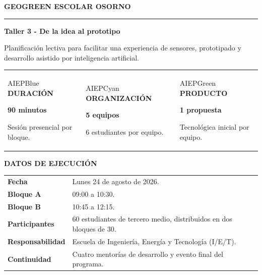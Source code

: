 \documentclass[10pt,a4paper]{article}
\newcommand{\kicker}[1]{%
  {\color{AIEPRed}\scriptsize\bfseries\MakeUppercase{#1}}\par\vspace{2.5mm}
  {\color{AIEPRed}\rule{13mm}{1.2pt}}\vspace{3mm}
}
\newcommand{\labeltext}[1]{%
  {\scriptsize\bfseries\color{AIEPSlate}\MakeUppercase{#1}}\par\vspace{1.2mm}
}
\begin{document}
\thispagestyle{fancy}
\kicker{GeoGreen Escolar Osorno}
{\Huge\bfseries\color{AIEPNavy} Taller 3 - De la idea al prototipo}\par
\vspace{2mm}
{\large\color{AIEPSlate} Planificación lectiva para facilitar una experiencia de sensores, prototipado y desarrollo asistido por inteligencia artificial.}\par
\vspace{6mm}

\begin{tabularx}{\textwidth}{Y Y Y}
\begin{softcard}[height=33mm,valign=top]{AIEPBlue}
\labeltext{Duración}
{\Large\bfseries\color{AIEPNavy}90 minutos}\par
Sesión presencial por bloque.
\end{softcard}
&
\begin{softcard}[height=33mm,valign=top]{AIEPCyan}
\labeltext{Organización}
{\Large\bfseries\color{AIEPNavy}5 equipos}\par
6 estudiantes por equipo.
\end{softcard}
&
\begin{softcard}[height=33mm,valign=top]{AIEPGreen}
\labeltext{Producto}
{\Large\bfseries\color{AIEPNavy}1 propuesta}\par
Tecnológica inicial por equipo.
\end{softcard}
\end{tabularx}

\vspace{4mm}
\begin{card}
\labeltext{Datos de ejecución}
\begin{tabularx}{\textwidth}{@{}L{36mm}Y@{}}
\textbf{Fecha} & Lunes 24 de agosto de 2026.\\
\textbf{Bloque A} & 09:00 a 10:30.\\
\textbf{Bloque B} & 10:45 a 12:15.\\
\textbf{Participantes} & 60 estudiantes de tercero medio, distribuidos en dos bloques de 30.\\
\textbf{Responsabilidad} & Escuela de Ingeniería, Energía y Tecnología (I/E/T).\\
\textbf{Continuidad} & Cuatro mentorías de desarrollo y evento final del programa.\\
\end{tabularx}
\end{card}
\end{document}
